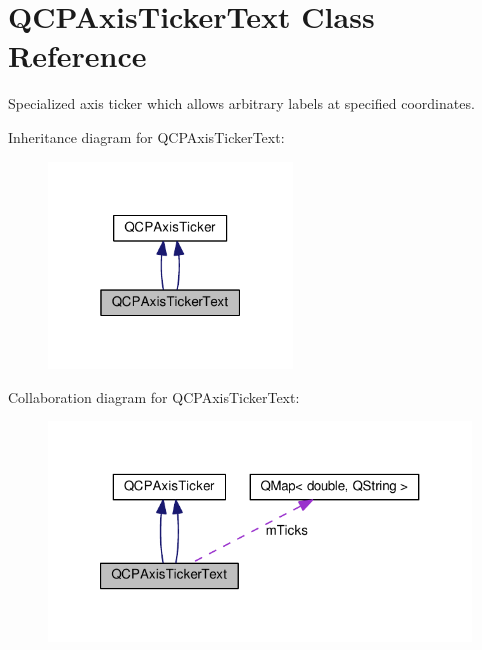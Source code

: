 \hypertarget{class_q_c_p_axis_ticker_text}{}\section{Q\+C\+P\+Axis\+Ticker\+Text Class Reference}
\label{class_q_c_p_axis_ticker_text}


Specialized axis ticker which allows arbitrary labels at specified coordinates.  




Inheritance diagram for Q\+C\+P\+Axis\+Ticker\+Text\+:\nopagebreak
\begin{figure}[H]
\begin{center}
\leavevmode
\includegraphics[width=184pt]{class_q_c_p_axis_ticker_text__inherit__graph}
\end{center}
\end{figure}


Collaboration diagram for Q\+C\+P\+Axis\+Ticker\+Text\+:\nopagebreak
\begin{figure}[H]
\begin{center}
\leavevmode
\includegraphics[width=321pt]{class_q_c_p_axis_ticker_text__coll__graph}
\end{center}
\end{figure}
